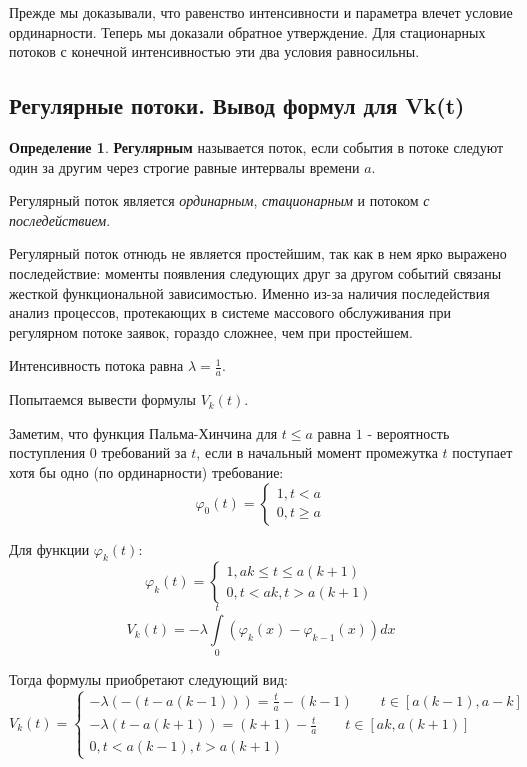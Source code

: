 \documentclass[aps,%
12pt,%
final,%
oneside,
onecolumn,%
musixtex, %
superscriptaddress,%
centertags]{article} %
\theoremstyle{plain}
\theoremstyle{definition}
\newtheorem{definition}{Определение}[subsection]
\theoremstyle{remark}
\begin{document}
Прежде мы доказывали, что равенство интенсивности и параметра влечет условие ординарности. Теперь мы доказали обратное утверждение. Для стационарных потоков с конечной интенсивностью эти два условия равносильны.

\newpage

\subsection{Регулярные потоки. Вывод формул для Vk(t)}

\begin{definition}
	\textbf{Регулярным} называется поток, если события в потоке следуют один за другим через строгие равные интервалы времени $a$.
\end{definition}

Регулярный поток является \textit{ординарным}, \textit{стационарным} и потоком \textit{с последействием}.

Регулярный поток отнюдь не является простейшим, так как в нем ярко выражено последействие: моменты появления следующих друг за другом событий связаны жесткой функциональной зависимостью. Именно из-за наличия последействия анализ процессов, протекающих в системе массового обслуживания при регулярном потоке заявок, гораздо сложнее, чем при простейшем.

Интенсивность потока равна $ \lambda = \frac{1}{a}$.

Попытаемся вывести формулы $V_k(t)$.

Заметим, что функция Пальма-Хинчина для $t \leq a$ равна $1$ - вероятность поступления $0$ требований за $t$, если в начальный момент промежутка $t$ поступает хотя бы одно (по ординарности) требование:
$$\varphi_0(t) = \begin{cases}
	1, t < a \\
	0, t \geq a
\end{cases}$$

Для функции $\varphi_k(t)$:
$$\varphi_k(t) = \begin{cases}
	1, ak \leq t \leq a(k+1)  \\
	0, t < ak , t> a(k+1)
\end{cases}$$
$$V_k(t) = -\lambda \int\limits_{0}^t (\varphi_k(x) - \varphi_{k-1}(x))dx$$

Тогда формулы приобретают следующий вид:
$$V_k(t) = \begin{cases}
	-\lambda (-(t-a(k-1))) = \frac{t}{a} - (k-1) \qquad t \in [a(k-1),a-k] \\
	-\lambda (t-a(k+1)) = (k+1) - \frac{t}{a} \qquad t \in [ak,a(k+1)] \\
	0, t < a(k-1), t > a(k+1)
\end{cases}$$
\end{document}
